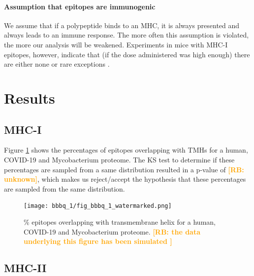\documentclass{article}
\newcommand{\richel}[1]{\textcolor{orange}{\textbf{[RB: #1]}}}
\begin{document}
\paragraph{Assumption that epitopes are immunogenic}

We assume that if a polypeptide binds to an MHC, it is always presented and always
leads to an immune response.
The more often this assumption is violated, 
the more our analysis will be weakened.
Experiments in mice with MHC-I epitopes, however, indicate that (if the dose 
administered was high enough) there are either none or rare
exceptions \cite{sette1994relationship}.

\section{Results}


\subsection{MHC-I}

Figure \ref{fig:1} shows the percentages of epitopes overlapping 
with TMHs for a human, COVID-19 and Mycobacterium proteome.
The KS test to determine if these percentages are sampled from
a same distribution resulted in a p-value of \richel{unknown},
which makes us reject/accept the hypothesis that these percentages
are sampled from the same distribution. 

\begin{figure}[!htbp]
  \texttt{[image: bbbq\_1/fig\_bbbq\_1\_watermarked.png]}
  \caption{
    \% epitopes overlapping with transmembrane helix
    for a human, COVID-19 and Mycobacterium proteome.
    \richel{
      the data underlying this figure has been simulated
    }
  }
  \label{fig:1}
\end{figure}

\subsection{MHC-II}
\end{document}

